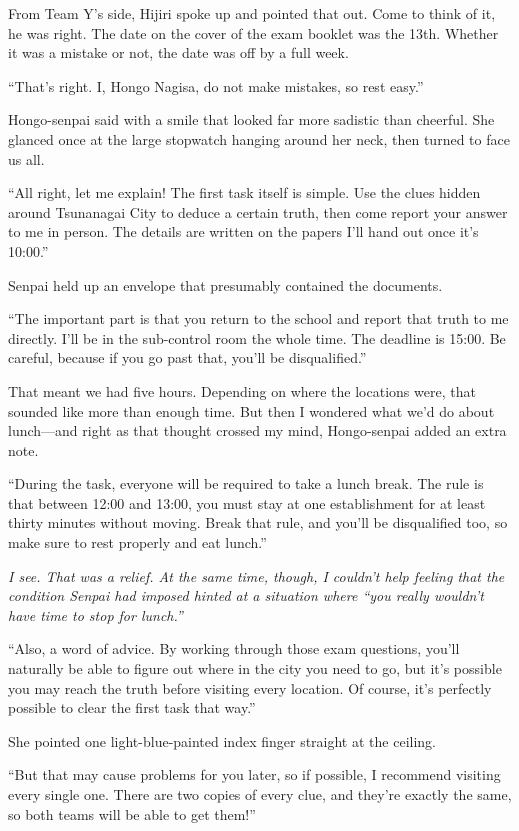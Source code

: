 \documentclass[
    a4paper,
    12pt,
    twoside,
    openany,
    UTF8,
    fontset=windows
]{ctexbook}
\begin{document}
From Team Y's side, Hijiri spoke up and pointed that out. Come to think of it, he was right. The date on the cover of the exam booklet was the 13th. Whether it was a mistake or not, the date was off by a full week.

``That's right. I, Hongo Nagisa, do not make mistakes, so rest easy.''

Hongo-senpai said with a smile that looked far more sadistic than cheerful. She glanced once at the large stopwatch hanging around her neck, then turned to face us all.

``All right, let me explain! The first task itself is simple. Use the clues hidden around Tsunanagai City to deduce a certain truth, then come report your answer to me in person. The details are written on the papers I'll hand out once it's 10:00.''

Senpai held up an envelope that presumably contained the documents.

``The important part is that you return to the school and report that truth to me directly. I'll be in the sub-control room the whole time. The deadline is 15:00. Be careful, because if you go past that, you'll be disqualified.''

That meant we had five hours. Depending on where the locations were, that sounded like more than enough time. But then I wondered what we'd do about lunch---and right as that thought crossed my mind, Hongo-senpai added an extra note.

``During the task, everyone will be required to take a lunch break. The rule is that between 12:00 and 13:00, you must stay at one establishment for at least thirty minutes without moving. Break that rule, and you'll be disqualified too, so make sure to rest properly and eat lunch.''

\textit{I see. That was a relief. At the same time, though, I couldn't help feeling that the condition Senpai had imposed hinted at a situation where ``you really wouldn't have time to stop for lunch.''}

``Also, a word of advice. By working through those exam questions, you'll naturally be able to figure out where in the city you need to go, but it's possible you may reach the truth before visiting every location. Of course, it's perfectly possible to clear the first task that way.''

She pointed one light-blue-painted index finger straight at the ceiling.

``But that may cause problems for you later, so if possible, I recommend visiting every single one. There are two copies of every clue, and they're exactly the same, so both teams will be able to get them!''
\end{document}
